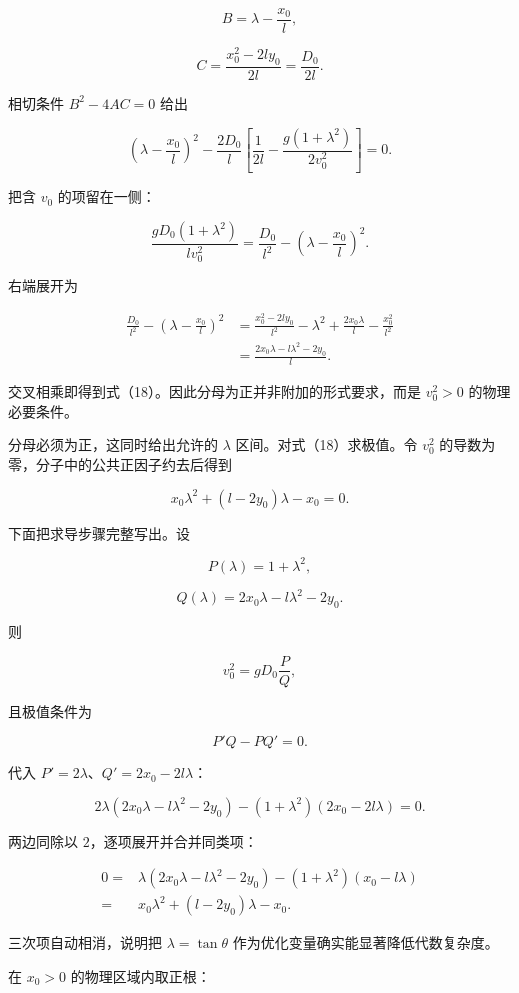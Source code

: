 \documentclass[12pt,a4paper,UTF8]{ctexart}
\begin{document}
\[B=\lambda-\frac{x_0}{l},\]

\[C=\frac{x_0^2-2ly_0}{2l}=\frac{D_0}{2l}.\]

相切条件 \(B^2-4AC=0\) 给出

\[\left(\lambda-\frac{x_0}{l}\right)^2
-\frac{2D_0}{l}\left[
\frac1{2l}-\frac{g(1+\lambda^2)}{2v_0^2}
\right]=0.\]

把含 \(v_0\) 的项留在一侧：

\[\frac{gD_0(1+\lambda^2)}{lv_0^2}
=\frac{D_0}{l^2}-\left(\lambda-\frac{x_0}{l}\right)^2.\]

右端展开为

\[\begin{aligned}
\frac{D_0}{l^2}-\left(\lambda-\frac{x_0}{l}\right)^2
&=\frac{x_0^2-2ly_0}{l^2}
-\lambda^2+\frac{2x_0\lambda}{l}-\frac{x_0^2}{l^2}\\
&=\frac{2x_0\lambda-l\lambda^2-2y_0}{l}.
\end{aligned}\]

交叉相乘即得到式（18）。因此分母为正并非附加的形式要求，而是 \(v_0^2>0\)
的物理必要条件。

分母必须为正，这同时给出允许的 \(\lambda\) 区间。对式（18）求极值。令
\(v_0^2\) 的导数为零，分子中的公共正因子约去后得到

\[x_0\lambda^2+(l-2y_0)\lambda-x_0=0. \tag{19}\]

下面把求导步骤完整写出。设

\[P(\lambda)=1+\lambda^2,\]

\[Q(\lambda)=2x_0\lambda-l\lambda^2-2y_0.\]

则

\[v_0^2=gD_0\frac{P}{Q},\]

且极值条件为

\[P'Q-PQ'=0.\]

代入 \(P'=2\lambda\)、\(Q'=2x_0-2l\lambda\)：

\[2\lambda(2x_0\lambda-l\lambda^2-2y_0)
-(1+\lambda^2)(2x_0-2l\lambda)=0.\]

两边同除以 \(2\)，逐项展开并合并同类项：

\[\begin{aligned}
0={}&\lambda(2x_0\lambda-l\lambda^2-2y_0)
-(1+\lambda^2)(x_0-l\lambda)\\
={}&x_0\lambda^2+(l-2y_0)\lambda-x_0.
\end{aligned}\]

三次项自动相消，说明把 \(\lambda=\tan\theta\)
作为优化变量确实能显著降低代数复杂度。

在 \(x_0>0\) 的物理区域内取正根：
\end{document}
